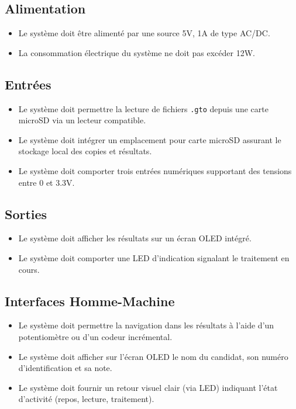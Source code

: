 \documentclass[a4paper,11pt]{article}
\begin{document}
\subsection{Alimentation}
\begin{itemize}
    \item Le système doit être alimenté par une source 5V, 1A de type AC/DC.
    \item La consommation électrique du système ne doit pas excéder 12W.
\end{itemize}

\subsection{Entrées}
\begin{itemize}
    \item Le système doit permettre la lecture de fichiers \texttt{.gto} depuis une carte microSD via un lecteur compatible.
    \item Le système doit intégrer un emplacement pour carte microSD assurant le stockage local des copies et résultats.
    \item Le système doit comporter trois entrées numériques supportant des tensions entre 0 et 3.3V.
\end{itemize}

\subsection{Sorties}
\begin{itemize}
    \item Le système doit afficher les résultats sur un écran OLED intégré.
    \item Le système doit comporter une LED d’indication signalant le traitement en cours.
\end{itemize}

\subsection{Interfaces Homme-Machine}
\begin{itemize}
    \item Le système doit permettre la navigation dans les résultats à l’aide d’un potentiomètre ou d’un codeur incrémental.
    \item Le système doit afficher sur l’écran OLED le nom du candidat, son numéro d’identification et sa note.
    \item Le système doit fournir un retour visuel clair (via LED) indiquant l’état d’activité (repos, lecture, traitement).
\end{itemize}
\end{document}

